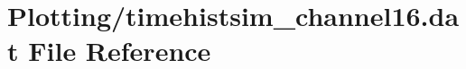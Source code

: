 \hypertarget{Plotting_2timehistsim__channel16_8dat}{}\section{Plotting/timehistsim\+\_\+channel16.dat File Reference}
\label{Plotting_2timehistsim__channel16_8dat}
